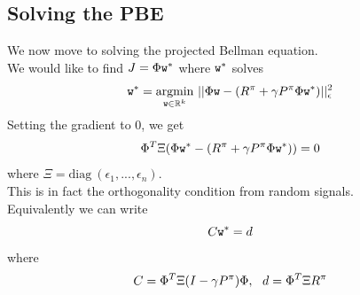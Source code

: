 \subsection{Solving the PBE}
We now move to solving the projected Bellman equation.\\
We would like to find $J = \Phi \texttt{w}^*$ where $\texttt{w}^*$ solves
$$\texttt{w}^* = \underset{{\texttt{w} \in \mathbb{R}^k}}{\operatorname{argmin}} \ ||\Phi \texttt{w} - (R^\pi+\gamma P^\pi\Phi \texttt{w}^*)||_\epsilon^2$$
Setting the gradient to $0$, we get
$$\Phi^T \Xi (\Phi \texttt{w}^* - (R^\pi+\gamma P^\pi \Phi \texttt{w}^*)) = 0$$
where $\Xi = \textrm{diag} \ (\epsilon_1,...,\epsilon_n)$.\\
This is in fact the orthogonality condition from random signals.\\
Equivalently we can write
$$C \texttt{w}^* = d$$
where
$$C = \Phi^T \Xi(I-\gamma P^\pi) \Phi, \ \ d = \Phi^T\Xi R^\pi$$

